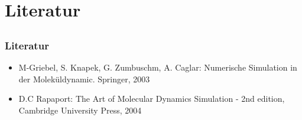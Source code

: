 \documentclass[compress]{beamer}
\begin{document}
\section{Literatur}
\subsection{}
\begin{frame}
	\frametitle{Literatur}
	\begin{itemize}
        \item M-Griebel, S. Knapek, G. Zumbuschm, A. Caglar: Numerische Simulation in der Moleküldynamic. Springer, 2003
		\item D.C Rapaport: The Art of Molecular Dynamics Simulation - 2nd edition, Cambridge University Press, 2004
	\end{itemize}
\end{frame}
\end{document}
